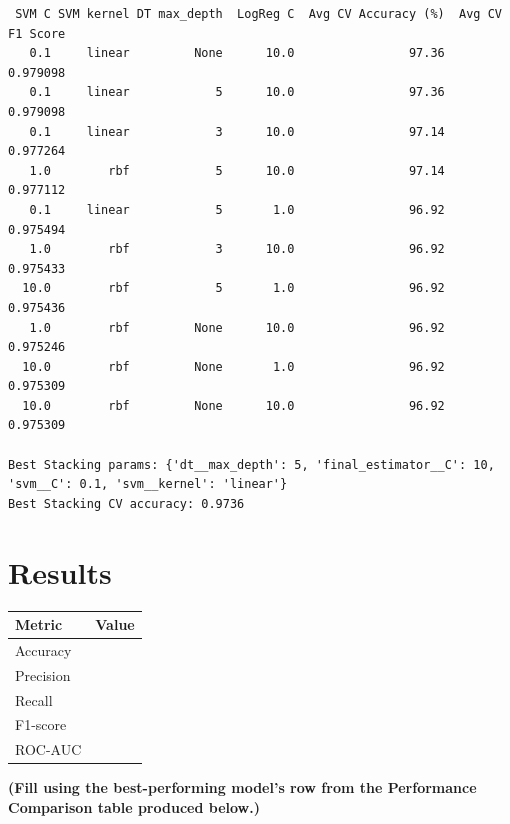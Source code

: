 \documentclass[12pt,a4paper]{article}
\begin{document}
\begin{verbatim}
 SVM C SVM kernel DT max_depth  LogReg C  Avg CV Accuracy (%)  Avg CV F1 Score
   0.1     linear         None      10.0                97.36         0.979098
   0.1     linear            5      10.0                97.36         0.979098
   0.1     linear            3      10.0                97.14         0.977264
   1.0        rbf            5      10.0                97.14         0.977112
   0.1     linear            5       1.0                96.92         0.975494
   1.0        rbf            3      10.0                96.92         0.975433
  10.0        rbf            5       1.0                96.92         0.975436
   1.0        rbf         None      10.0                96.92         0.975246
  10.0        rbf         None       1.0                96.92         0.975309
  10.0        rbf         None      10.0                96.92         0.975309

Best Stacking params: {'dt__max_depth': 5, 'final_estimator__C': 10, 'svm__C': 0.1, 'svm__kernel': 'linear'}
Best Stacking CV accuracy: 0.9736
\end{verbatim}

\section{Results}
\label{sec:orgd86003b}

\begin{center}
\begin{tabular}{lc}
Metric & Value\\[0pt]
\hline
Accuracy & \\[0pt]
Precision & \\[0pt]
Recall & \\[0pt]
F1-score & \\[0pt]
ROC-AUC & \\[0pt]
\end{tabular}
\end{center}

\textbf{(Fill using the best-performing model's row from the Performance Comparison table produced below.)}
\end{document}
